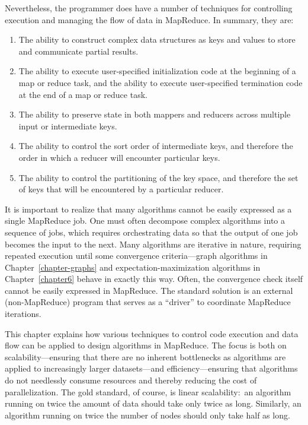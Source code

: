\noindent Nevertheless, the programmer does have a number of
techniques for controlling execution and managing the flow of data in
MapReduce.  In summary, they are:

\begin{enumerate}

\item The ability to construct complex data structures as keys and
  values to store and communicate partial results.

\item The ability to execute user-specified initialization code at the
  beginning of a map or reduce task, and the ability to execute
  user-specified termination code at the end of a map or reduce task.

\item The ability to preserve state in both mappers and reducers
  across multiple input or intermediate keys.

\item The ability to control the sort order of intermediate keys, and
  therefore the order in which a reducer will encounter particular
  keys.

\item The ability to control the partitioning of the key space, and
  therefore the set of keys that will be encountered by a particular
  reducer.

\end{enumerate}

\noindent It is important to realize that many algorithms cannot be
easily expressed as a single MapReduce job.  One must often decompose
complex algorithms into a sequence of jobs, which requires
orchestrating data so that the output of one job becomes the input to
the next.  Many algorithms are iterative in nature, requiring repeated
execution until some convergence criteria---graph algorithms in
Chapter~\ref{chapter-graphs} and expectation-maximization algorithms
in Chapter~\ref{chapter6} behave in exactly this way.  Often, the
convergence check itself cannot be easily expressed in MapReduce.  The
standard solution is an external (non-MapReduce) program that serves
as a ``driver'' to coordinate MapReduce iterations.

This chapter explains how various techniques to control code execution
and data flow can be applied to design algorithms in MapReduce.  The
focus is both on scalability---ensuring that there are no inherent
bottlenecks as algorithms are applied to increasingly larger
datasets---and efficiency---ensuring that algorithms do not needlessly
consume resources and thereby reducing the cost of parallelization.
The gold standard, of course, is linear scalability:\ an algorithm
running on twice the amount of data should take only twice as long.
Similarly, an algorithm running on twice the number of nodes should
only take half as long.  

